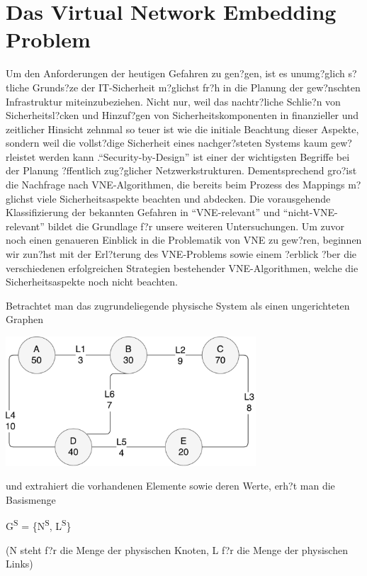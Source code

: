 \documentclass{lni}
\begin{document}
\section{Das Virtual Network Embedding Problem}
\label{sec:VNE-Problem}
Um den Anforderungen der heutigen Gefahren zu gen?gen, ist es unumg?glich s?tliche Grunds?ze der IT-Sicherheit m?glichst fr?h in die Planung der gew?nschten Infrastruktur miteinzubeziehen. Nicht nur, weil das nachtr?liche Schlie?n von Sicherheitsl?cken und Hinzuf?gen von Sicherheitskomponenten in finanzieller und zeitlicher Hinsicht zehnmal so teuer ist wie die initiale Beachtung dieser Aspekte, sondern weil die vollst?dige Sicherheit eines nachger?steten Systems kaum gew?rleistet werden kann \cite{Cole}."`Security-by-Design"' ist einer der wichtigsten Begriffe bei der Planung ?ffentlich zug?glicher Netzwerkstrukturen. Dementsprechend gro?ist die Nachfrage nach VNE-Algorithmen, die bereits beim Prozess des Mappings m?glichst viele Sicherheitsaspekte beachten und abdecken. Die vorausgehende Klassifizierung der bekannten Gefahren in "`VNE-relevant"' und "`nicht-VNE-relevant"' bildet die Grundlage f?r unsere weiteren Untersuchungen. Um zuvor noch einen genaueren Einblick in die Problematik von VNE zu gew?ren, beginnen wir zun?hst mit der Erl?terung des VNE-Problems sowie einem ?erblick ?ber die verschiedenen erfolgreichen Strategien bestehender VNE-Algorithmen, welche die Sicherheitsaspekte noch nicht beachten. 

Betrachtet man das zugrundeliegende physische System als einen ungerichteten Graphen
\begin{center}
	\includegraphics[width=0.7\textwidth]{physical_structure2.pdf}\newline
\end{center}
\vspace*{1cm}

und extrahiert die vorhandenen Elemente sowie deren Werte, erh?t man die Basismenge
\begin{center}
G\textsuperscript{S} = \{N\textsuperscript{S}, L\textsuperscript{S}\}\newline

(N steht f?r die Menge der physischen Knoten, L f?r die Menge der physischen Links)
\end{center}
\end{document}
